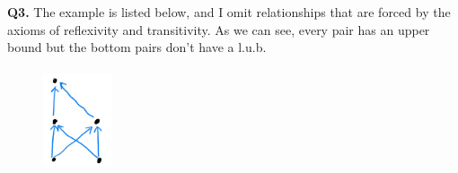 \documentclass{article}[12pt]
\begin{document}
\noindent \textbf{Q3.}
The example is listed below, and I omit relationships that are forced by the axioms of reflexivity and transitivity. As we can see, every pair has an upper bound but the bottom pairs don't have a l.u.b.
\begin{figure}[H]
	\centering
	\includegraphics[width=2cm,height=3cm]{Q3.jpg} 
	\end{figure}
\end{document}

